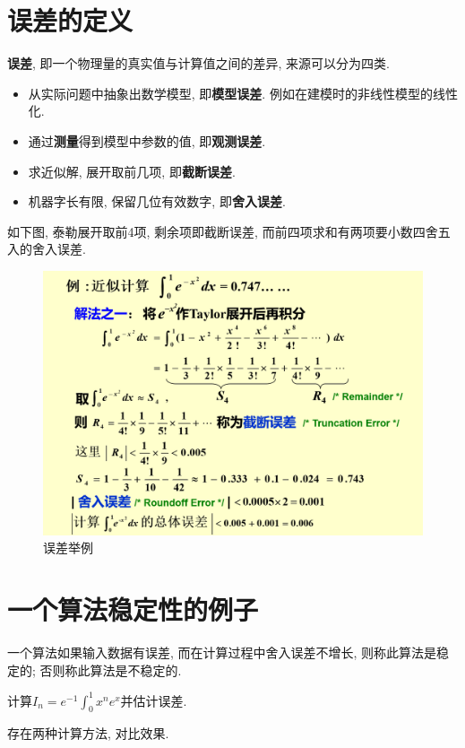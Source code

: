 \documentclass[lang=cn,newtx,12pt,scheme=chinese]{elegantbook}
\begin{document}
\section{误差的定义}
\textbf{误差}, 即一个物理量的真实值与计算值之间的差异, 来源可以分为四类.
\begin{itemize}
	\item 从实际问题中抽象出数学模型, 即\textbf{模型误差}. 例如在建模时的非线性模型的线性化.
	\item 通过\textbf{测量}得到模型中参数的值, 即\textbf{观测误差}.
	\item 求近似解, 展开取前几项, 即\textbf{截断误差}.
	\item 机器字长有限, 保留几位有效数字, 即\textbf{舍入误差}.
\end{itemize}
如下图, 泰勒展开取前4项, 剩余项即截断误差, 而前四项求和有两项要小数四舍五入的舍入误差.
\begin{figure}[H]
	\centering
	\includegraphics[width=0.9\linewidth]{image/误差1}
	\caption{误差举例}
	\label{fig:1}
\end{figure}
\section{一个算法稳定性的例子}
\begin{definition}
	一个算法如果输入数据有误差, 而在计算过程中舍入误差不增长, 则称此算法是稳定的; 否则称此算法是不稳定的.
\end{definition}
\begin{example}
	计算$I_n=e^{-1}\int_{0}^{1}x^ne^x$并估计误差.
\end{example}
存在两种计算方法, 对比效果.
\end{document}
